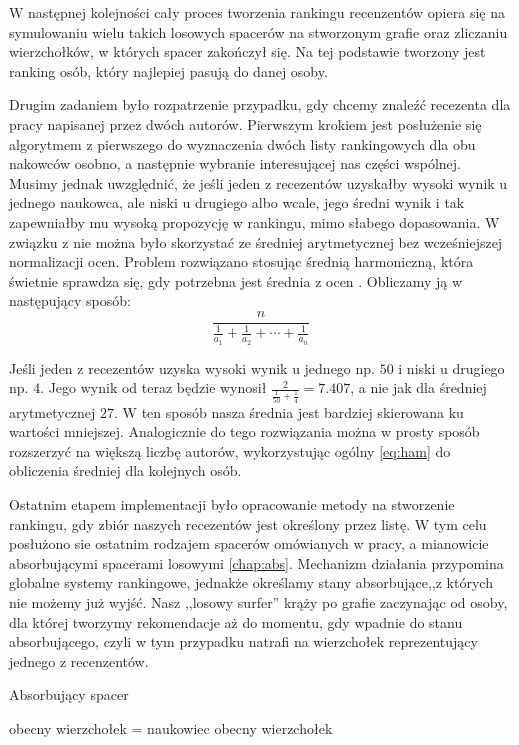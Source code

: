 W następnej kolejności cały proces tworzenia rankingu recenzentów opiera się na symulowaniu wielu takich losowych spacerów na stworzonym grafie oraz zliczaniu wierzchołków, w których spacer zakończył się. Na tej podstawie tworzony jest ranking osób, który najlepiej pasują do danej osoby.

Drugim zadaniem było rozpatrzenie przypadku, gdy chcemy znaleźć recezenta dla pracy napisanej przez dwóch autorów. 
Pierwszym krokiem jest posłużenie się algorytmem z pierwszego do wyznaczenia dwóch listy rankingowych dla obu nakowców osobno, a następnie wybranie interesującej nas części wspólnej. Musimy jednak uwzględnić, że jeśli jeden z recezentów uzyskałby wysoki wynik u jednego naukowca, ale niski u drugiego albo wcale, jego średni wynik i tak zapewniałby mu wysoką propozycję w rankingu, mimo słabego dopasowania. W związku z nie można było skorzystać ze średniej arytmetycznej bez wcześniejszej normalizacji ocen. Problem rozwiązano stosując średnią harmoniczną, która świetnie sprawdza się, gdy potrzebna jest średnia z ocen \cite{HarmonicMean}. Obliczamy ją w następujący sposób:
\begin{equation}
\label{eq:ham}
    \frac{n}{\frac{1}{a_1} + \frac{1}{a_2} + \cdots + \frac{1}{a_n}}
\end{equation}

Jeśli jeden z recezentów uzyska wysoki wynik u jednego np. $50$ i niski u drugiego np. $4$. Jego wynik od teraz będzie wynosił $\frac{2}{\frac{1}{50}+\frac{1}{4}}= 7.407$, a nie jak dla średniej arytmetycznej $27$. W ten sposób nasza średnia jest bardziej skierowana ku wartości mniejszej. Analogicznie do tego rozwiązania można w prosty sposób rozszerzyć na większą liczbę autorów, wykorzystując ogólny \ref{eq:ham} do obliczenia średniej dla kolejnych osób.

Ostatnim etapem implementacji było opracowanie metody na stworzenie rankingu, gdy zbiór naszych recezentów jest określony przez listę. W tym celu posłużono sie ostatnim rodzajem spacerów omówianych w pracy, a mianowicie absorbującymi spacerami losowymi \ref{chap:abs}. Mechanizm działania przypomina globalne systemy rankingowe, jednakże określamy stany absorbujące,,z których nie możemy już wyjść. Nasz ,,losowy surfer'' krąży po grafie zaczynając od osoby, dla której tworzymy rekomendacje aż do momentu, gdy wpadnie do stanu absorbującego, czyli w tym przypadku natrafi na wierzchołek reprezentujący jednego z recenzentów.


\begin{pseudokod}
\DontPrintSemicolon
\caption{Absorbujący spacer}
obecny wierzchołek = naukowiec\;
\KwRet obecny wierzchołek \;
\end{pseudokod}

